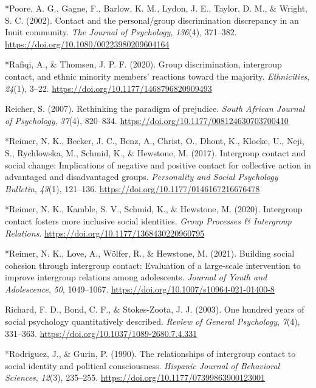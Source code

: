 \documentclass[12pt, letterpaper]{article}
\begin{document}
\leavevmode\hypertarget{ref-1762}{}%
*Poore, A. G., Gagne, F., Barlow, K. M., Lydon, J. E., Taylor, D. M., \&
Wright, S. C. (2002). Contact and the personal/group discrimination
discrepancy in an Inuit community. \emph{The Journal of Psychology},
\emph{136}(4), 371--382. \url{https://doi.org/10.1080/00223980209604164}

\leavevmode\hypertarget{ref-3051}{}%
*Rafiqi, A., \& Thomsen, J. P. F. (2020). Group discrimination,
intergroup contact, and ethnic minority members' reactions toward the
majority. \emph{Ethnicities}, \emph{24}(1), 3--22.
\url{https://doi.org/10.1177/1468796820909493}

\leavevmode\hypertarget{ref-reicher_rethinking_2007}{}%
Reicher, S. (2007). Rethinking the paradigm of prejudice. \emph{South
African Journal of Psychology}, \emph{37}(4), 820--834.
\url{https://doi.org/10.1177/008124630703700410}

\leavevmode\hypertarget{ref-956}{}%
*Reimer, N. K., Becker, J. C., Benz, A., Christ, O., Dhont, K., Klocke,
U., Neji, S., Rychlowska, M., Schmid, K., \& Hewstone, M. (2017).
Intergroup contact and social change: Implications of negative and
positive contact for collective action in advantaged and disadvantaged
groups. \emph{Personality and Social Psychology Bulletin}, \emph{43}(1),
121--136. \url{https://doi.org/10.1177/0146167216676478}

\leavevmode\hypertarget{ref-2380}{}%
*Reimer, N. K., Kamble, S. V., Schmid, K., \& Hewstone, M. (2020).
Intergroup contact fosters more inclusive social identities. \emph{Group
Processes \& Intergroup Relations}.
\url{https://doi.org/10.1177/1368430220960795}

\leavevmode\hypertarget{ref-2399}{}%
*Reimer, N. K., Love, A., Wölfer, R., \& Hewstone, M. (2021). Building
social cohesion through intergroup contact: Evaluation of a large-scale
intervention to improve intergroup relations among adolescents.
\emph{Journal of Youth and Adolescence}, \emph{50}, 1049--1067.
\url{https://doi.org/10.1007/s10964-021-01400-8}

\leavevmode\hypertarget{ref-richard_one_2003}{}%
Richard, F. D., Bond, C. F., \& Stokes-Zoota, J. J. (2003). One hundred
years of social psychology quantitatively described. \emph{Review of
General Psychology}, \emph{7}(4), 331--363.
\url{https://doi.org/10.1037/1089-2680.7.4.331}

\leavevmode\hypertarget{ref-803}{}%
*Rodriguez, J., \& Gurin, P. (1990). The relationships of intergroup
contact to social identity and political consciousness. \emph{Hispanic
Journal of Behavioral Sciences}, \emph{12}(3), 235--255.
\url{https://doi.org/10.1177/07399863900123001}
\end{document}
